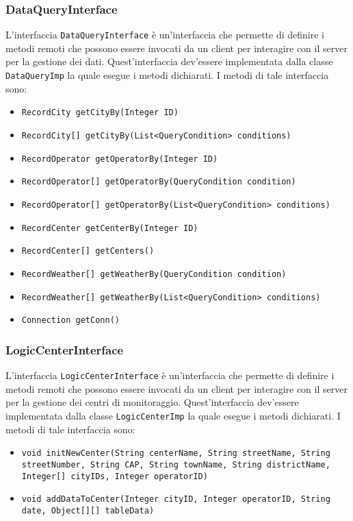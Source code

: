 \subsubsection{DataQueryInterface}
L'interfaccia \texttt{DataQueryInterface} è un'interfaccia che permette di definire i metodi remoti che possono
essere invocati da un client per interagire con il server per la gestione dei dati.
Quest'interfaccia dev'essere implementata dalla classe \texttt{DataQueryImp} la quale esegue i metodi dichiarati.
I metodi di tale interfaccia sono:
\begin{itemize}
\item \texttt{RecordCity getCityBy(Integer ID)}
\item \texttt{RecordCity[] getCityBy(List<QueryCondition> conditions)}
\item \texttt{RecordOperator getOperatorBy(Integer ID)}
\item \texttt{RecordOperator[] getOperatorBy(QueryCondition condition)}
\item \texttt{RecordOperator[] getOperatorBy(List<QueryCondition> conditions)}
\item \texttt{RecordCenter getCenterBy(Integer ID)}
\item \texttt{RecordCenter[] getCenters()}
\item \texttt{RecordWeather[] getWeatherBy(QueryCondition condition)}
\item \texttt{RecordWeather[] getWeatherBy(List<QueryCondition> conditions)}
\item \texttt{Connection getConn()}
\end{itemize}

\subsubsection{LogicCenterInterface}
L'interfaccia \texttt{LogicCenterInterface} è un'interfaccia che permette di definire i metodi remoti che possono
essere invocati da un client per interagire con il server per la gestione dei centri di monitoraggio.
Quest'interfaccia dev'essere implementata dalla classe \texttt{LogicCenterImp} la quale esegue i metodi dichiarati.
I metodi di tale interfaccia sono:
\begin{itemize}
\item \texttt{void initNewCenter(String centerName, String streetName, String streetNumber, String CAP, String townName, String districtName, Integer[] cityIDs, Integer operatorID)}
\item \texttt{void addDataToCenter(Integer cityID, Integer operatorID, String date, Object[][] tableData)}
\end{itemize}

